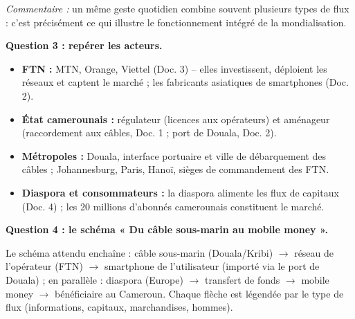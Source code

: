 \documentclass[11pt]{article}
\begin{document}
\begin{exoresolu}
\emph{Commentaire :} un même geste quotidien combine souvent plusieurs types de flux : c'est précisément ce qui illustre le fonctionnement intégré de la mondialisation.

\textbf{Question 3 : repérer les acteurs.}

\begin{itemize}
\item \textbf{FTN :} MTN, Orange, Viettel (Doc. 3) -- elles investissent, déploient les réseaux et captent le marché ; les fabricants asiatiques de smartphones (Doc. 2).
\item \textbf{État camerounais :} régulateur (licences aux opérateurs) et aménageur (raccordement aux câbles, Doc. 1 ; port de Douala, Doc. 2).
\item \textbf{Métropoles :} Douala, interface portuaire et ville de débarquement des câbles ; Johannesburg, Paris, Hanoï, sièges de commandement des FTN.
\item \textbf{Diaspora et consommateurs :} la diaspora alimente les flux de capitaux (Doc. 4) ; les 20 millions d'abonnés camerounais constituent le marché.
\end{itemize}

\textbf{Question 4 : le schéma « Du câble sous-marin au mobile money ».}

Le schéma attendu enchaîne : câble sous-marin (Douala/Kribi) $\rightarrow$ réseau de l'opérateur (FTN) $\rightarrow$ smartphone de l'utilisateur (importé via le port de Douala) ; en parallèle : diaspora (Europe) $\rightarrow$ transfert de fonds $\rightarrow$ mobile money $\rightarrow$ bénéficiaire au Cameroun. Chaque flèche est légendée par le type de flux (informations, capitaux, marchandises, hommes).

\begin{popfigure}
\end{popfigure}
\end{exoresolu}
\end{document}
